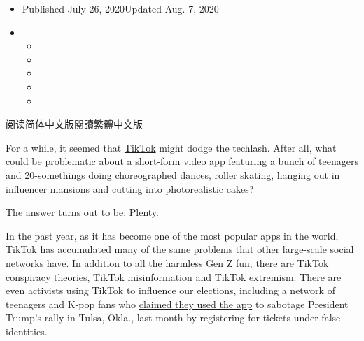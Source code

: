 \begin{itemize}
\item
  Published July 26, 2020Updated Aug. 7, 2020
\item
  \begin{itemize}
  \item
  \item
  \item
  \item
  \item
  \end{itemize}
\end{itemize}

\href{https://cn.nytimes.com/technology/20200728/tiktok-china-ban-model/}{阅读简体中文版}\href{https://cn.nytimes.com/technology/20200728/tiktok-china-ban-model/zh-hant/}{閱讀繁體中文版}

For a while, it seemed that
\href{https://www.nytimes.com/2020/08/07/nyregion/tiktok-manslaughter-new-jersey.html}{TikTok}
might dodge the techlash. After all, what could be problematic about a
short-form video app featuring a bunch of teenagers and 20-somethings
doing
\href{https://www.nytimes.com/2020/02/13/style/the-original-renegade.html}{choreographed
dances},
\href{https://www.buzzfeednews.com/article/laurenstrapagiel/roller-skating-is-back-tiktok-ana-coto}{roller
skating}, hanging out in
\href{https://www.nytimes.com/2020/01/03/style/hype-house-los-angeles-tik-tok.html}{influencer
mansions} and cutting into
\href{https://www.nytimes.com/2020/07/14/style/what-is-the-cake-meme.html}{photorealistic
cakes}?

The answer turns out to be: Plenty.

In the past year, as it has become one of the most popular apps in the
world, TikTok has accumulated many of the same problems that other
large-scale social networks have. In addition to all the harmless Gen Z
fun, there are
\href{https://www.nytimes.com/2020/06/29/technology/pizzagate-tiktok.html}{TikTok
conspiracy theories},
\href{https://www.rollingstone.com/culture/culture-features/tiktok-conspiracy-theories-bill-gates-microchip-vaccine-996394/}{TikTok
misinformation} and
\href{https://www.bbc.com/news/technology-53269361}{TikTok extremism}.
There are even activists using TikTok to influence our elections,
including a network of teenagers and K-pop fans who
\href{https://www.nytimes.com/2020/06/21/style/tiktok-trump-rally-tulsa.html}{claimed
they used the app} to sabotage President Trump's rally in Tulsa, Okla.,
last month by registering for tickets under false identities.

